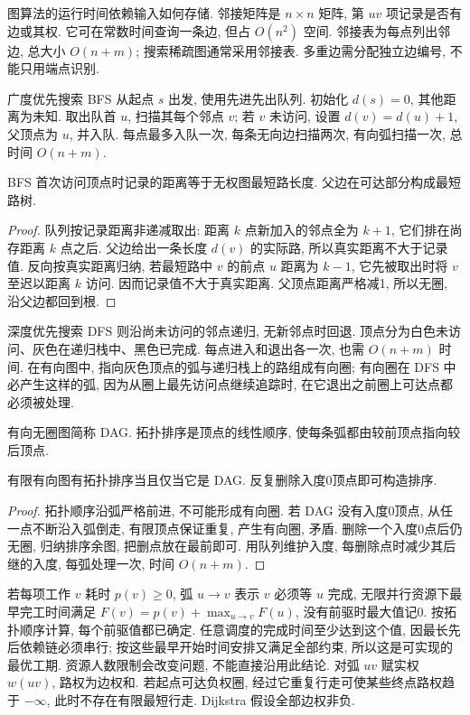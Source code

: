 \label{ch:shortest}
图算法的运行时间依赖输入如何存储. 邻接矩阵是 $n\times n$ 矩阵, 第 $uv$ 项记录是否有边或其权. 它可在常数时间查询一条边, 但占 $O(n^2)$ 空间. 邻接表为每点列出邻边, 总大小 $O(n+m)$; 搜索稀疏图通常采用邻接表. 多重边需分配独立边编号, 不能只用端点识别.

广度优先搜索 BFS 从起点 $s$ 出发, 使用先进先出队列. 初始化 $d(s)=0$, 其他距离为未知. 取出队首 $u$, 扫描其每个邻点 $v$; 若 $v$ 未访问, 设置 $d(v)=d(u)+1$, 父顶点为 $u$, 并入队. 每点最多入队一次, 每条无向边扫描两次, 有向弧扫描一次, 总时间 $O(n+m)$.
\begin{theorem}\label{thm:bfs}
BFS 首次访问顶点时记录的距离等于无权图最短路长度. 父边在可达部分构成最短路树.
\end{theorem}
\begin{proof}
队列按记录距离非递减取出: 距离 $k$ 点新加入的邻点全为 $k+1$, 它们排在尚存距离 $k$ 点之后. 父边给出一条长度 $d(v)$ 的实际路, 所以真实距离不大于记录值. 反向按真实距离归纳, 若最短路中 $v$ 的前点 $u$ 距离为 $k-1$, 它先被取出时将 $v$ 至迟以距离 $k$ 访问. 因而记录值不大于真实距离. 父顶点距离严格减1, 所以无圈, 沿父边都回到根.
\end{proof}
深度优先搜索 DFS 则沿尚未访问的邻点递归, 无新邻点时回退. 顶点分为白色未访问、灰色在递归栈中、黑色已完成. 每点进入和退出各一次, 也需 $O(n+m)$ 时间. 在有向图中, 指向灰色顶点的弧与递归栈上的路组成有向圈; 有向圈在 DFS 中必产生这样的弧, 因为从圈上最先访问点继续追踪时, 在它退出之前圈上可达点都必须被处理.
\begin{definition}
有向无圈图简称 DAG. 拓扑排序是顶点的线性顺序, 使每条弧都由较前顶点指向较后顶点.
\end{definition}
\begin{theorem}\label{thm:toposort}
有限有向图有拓扑排序当且仅当它是 DAG. 反复删除入度0顶点即可构造排序.
\end{theorem}
\begin{proof}
拓扑顺序沿弧严格前进, 不可能形成有向圈. 若 DAG 没有入度0顶点, 从任一点不断沿入弧倒走, 有限顶点保证重复, 产生有向圈, 矛盾. 删除一个入度0点后仍无圈, 归纳排序余图, 把删点放在最前即可. 用队列维护入度, 每删除点时减少其后继的入度, 每弧处理一次, 时间 $O(n+m)$.
\end{proof}
若每项工作 $v$ 耗时 $p(v)\ge0$, 弧 $u\to v$ 表示 $v$ 必须等 $u$ 完成, 无限并行资源下最早完工时间满足 $F(v)=p(v)+\max_{u\to v}F(u)$, 没有前驱时最大值记0. 按拓扑顺序计算, 每个前驱值都已确定. 任意调度的完成时间至少达到这个值, 因最长先后依赖链必须串行; 按这些最早开始时间安排又满足全部约束, 所以这是可实现的最优工期. 资源人数限制会改变问题, 不能直接沿用此结论.
对弧 $uv$ 赋实权 $w(uv)$, 路权为边权和. 若起点可达负权圈, 经过它重复行走可使某些终点路权趋于 $-\infty$, 此时不存在有限最短行走. Dijkstra 假设全部边权非负.

